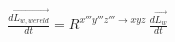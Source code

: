 \begin{equation*}
\begin{split}
&\frac{d\overrightarrow{L_{w,wereld}}}{dt}=R^{x'''y'''z''' \rightarrow xyz}\,\frac{d\overrightarrow{L_{w}}}{dt}\\

\end{split}
\end{equation*}
